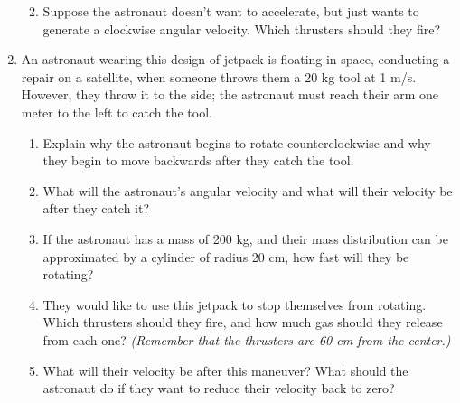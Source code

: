 \documentclass[12pt]{article}
\begin{document}
\begin{enumerate}
\begin{enumerate}
						\vspace{0.5in}
			
			\item Suppose the astronaut doesn't want to accelerate, but just wants to generate a clockwise angular velocity. Which thrusters should they fire?
		\end{enumerate}
		\newpage
		
			\item An astronaut wearing this design of jetpack is floating in space, conducting a repair on a satellite, when someone throws them a 20 kg tool at 1 m/s. However, they throw it to the side; the astronaut must reach 
				their arm one meter to the left to catch the tool. 

				\begin{enumerate}
					\item Explain why the astronaut begins to rotate counterclockwise and why they begin to move backwards after they catch the tool.
					
					\vspace{1in}
					
					\item What will the astronaut's angular velocity and what will their velocity be after they catch it?
					
					\vspace{2in}
					
					\item If the astronaut has a mass of 200 kg, and their mass distribution can be approximated by a cylinder of radius 20 cm, how fast will they be rotating?
					
					\vspace{2in}
					
					\newpage
					
					\item They would like to use this jetpack to stop themselves from rotating. Which thrusters should they fire, and how much gas should they release from each one? {\it (Remember that the thrusters are 60 cm from the center.)}
					
					\vspace{3in}
					
					\item What will their velocity be after this maneuver? What should the astronaut do if they want to reduce their velocity back to zero?
				\end{enumerate}




\end{enumerate}
\end{document}
